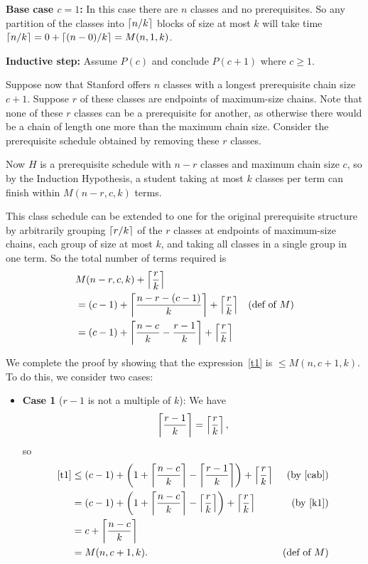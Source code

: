 \documentclass[12pt]{article}
\begin{document}
\begin{enumerate}
{\textbf{Base case $c=1$:} In this case there are $n$ classes and no prerequisites.  So any partition of the classes into $\left\lceil n/k\right\rceil$ blocks
of size at most $k$ will take time
$\left\lceil n/k\right\rceil = 0 + \left\lceil(n-0)/k\right\rceil = M(n,1,k)$.

\textbf{Inductive step:}
Assume $P(c)$ and conclude $P(c+1)$ where $c \geq 1$.

Suppose now that Stanford offers $n$ classes with a longest prerequisite chain size $c+1$.
Suppose $r$ of these classes are endpoints of maximum-size chains.  Note
that none of these $r$ classes can be a prerequisite for another, as otherwise there
would be a chain of length one more than the maximum chain size. Consider the prerequisite schedule obtained by removing these $r$ classes.

Now $H$ is a prerequisite schedule with $n-r$ classes and maximum chain size $c$, so by
the Induction Hypothesis, a student taking at most $k$ classes per term can finish within $M(n-r,c,k)$ terms.

This class schedule can be extended to one for the original prerequisite structure by
arbitrarily grouping $\left\lceil r/k\right\rceil$ of the $r$ classes at endpoints of maximum-size chains, each group of size at most $k$, and taking all classes in a single group in one term. So the total number of terms required is
\begin{align}
\lefteqn{M(n-r,c,k) + \ceil{\frac{r}{k}}}\notag\\
  & = (c-1) + \ceil{\frac{n-r-(c-1)}{k}} + \ceil{\frac{r}{k}} & \text{(def of $M$)}\notag\\
  & = (c-1) + \ceil{\frac{n-c}{k} - \frac{r-1}{k}} + \ceil{\frac{r}{k}}
\label{t1}
\end{align}

We complete the proof by showing that the expression~\eqref{t1} is $\leq
M(n, c+1, k)$.  To do this, we consider two cases:

\begin{itemize}

\item \textbf{Case 1} ($r-1$ is not a multiple of $k$):
We have
\begin{equation}\label{k1}
\left\lceil\frac{r-1}{k}\right\rceil = \left\lceil\frac{r}{k}\right\rceil,
\end{equation}
so
\begin{align*}
\text{\eqref{t1}}
   & \leq (c-1) + \left(1+ \left\lceil\frac{n-c}{k}\right\rceil -
   \left\lceil\frac{r-1}{k}\right\rceil\right) + \left\lceil\frac{r}{k}\right\rceil & \text{(by~\eqref{cab})}\\
   & = (c-1) + \left(1+ \left\lceil\frac{n-c}{k}\right\rceil -
      \left\lceil\frac{r}{k}\right\rceil\right) + \left\lceil\frac{r}{k}\right\rceil & \text{(by~\eqref{k1})}\\
   & = c + \left\lceil\frac{n-c}{k}\right\rceil\\
   & = M(n, c+1, k). & \text{(def of $M$)}
\end{align*}


\end{itemize}}
\end{enumerate}
\end{document}

